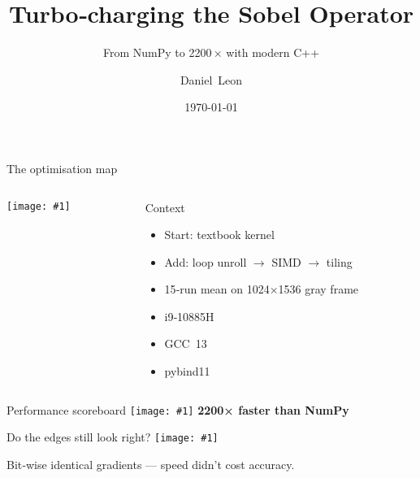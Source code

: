 \documentclass[aspectratio=169,professionalfonts]{beamer}  %
\title{Turbo‑charging the Sobel Operator}
\subtitle{From NumPy to \num{2200}\,× with modern C++}
\author{Daniel Leon}
\date{\today}
\newcommand{\fullimg}[1]{\texttt{[image: \#1]}}
\newcommand{\halfimg}[1]{\texttt{[image: \#1]}}
\begin{document}
\maketitle

\begin{frame}[t]{The optimisation map}
  \begin{columns}[T]
    \begin{column}{0.68\linewidth}
      \centering
      \fullimg{figures/optimization_techniques.png}
    \end{column}

    \begin{column}{0.30\linewidth}
      \begin{block}{Context}
        \begin{itemize}
          \item Start: textbook kernel
          \item Add: loop unroll \(\rightarrow\) SIMD \(\rightarrow\) tiling
          \item 15‑run mean on \num{1024}×\num{1536} gray frame
          \item i9‑10885H 
          \item GCC 13 
          \item pybind11
        \end{itemize}
      \end{block}
    \end{column}
  \end{columns}
\end{frame}

\begin{frame}[t]{Performance scoreboard}
  \centering
  \fullimg{figures/performance_comparison_all_opts.png}
  \vspace{0.4em}
  {\Large\textcolor{speedup}{\textbf{\num{2200}× faster than NumPy}}}
\end{frame}

\begin{frame}[t]{Do the edges still look right?}
  \centering
  \halfimg{figures/results_quality_comparison_all_opts - crop.png}

  \vspace{0.4em}
  Bit‑wise identical gradients — speed didn’t cost accuracy.
\end{frame}
\end{document}
